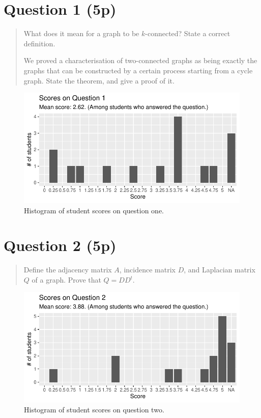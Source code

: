 \documentclass[nobib]{tufte-handout}
\begin{document}
\section{Question 1 (5p)} %

\begin{quotation}
  What does it mean for a graph to be $k$-connected? State a correct definition.

  We proved a characterisation of two-connected graphs as being exactly the graphs that can be constructed by a certain process starting from a cycle graph. State the theorem, and give a proof of it.
\end{quotation}

\begin{figure}[p]
  \centering
  \includegraphics[width = \textwidth]{Q1.pdf}
  \caption[Score histogram for Q1]{Histogram of student scores on question one.}
  \label{fig:Q1}
\end{figure}

\section{Question 2 (5p)} %

\begin{quotation}
  Define the adjacency matrix $A$, incidence matrix $D$, and Laplacian matrix $Q$ of a graph. Prove that $Q = DD^t$.
\end{quotation}

\begin{figure}[p]
  \centering
  \includegraphics[width = \textwidth]{Q2.pdf}
  \caption[Score histogram for Q2]{Histogram of student scores on question two.}
  \label{fig:Q2}
\end{figure}
\end{document}

